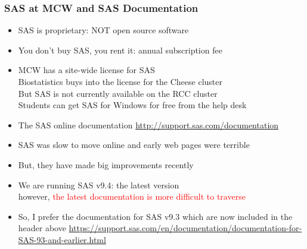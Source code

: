 \documentclass[11pt,pdftex,dvipsnames,usenames,helvetica]{beamer}
\begin{document}
\begin{frame}[fragile]
\frametitle{SAS at MCW and SAS Documentation}
\begin{itemize}
\item SAS is proprietary: NOT open source software
\item You don't buy SAS, you rent it: annual subscription fee
\item MCW has a site-wide license for SAS\\
Biostatistics buys into the license for the Cheese cluster\\
But SAS is not currently available on the RCC cluster\\
Students can get SAS for Windows for free from the help desk\\
\item The SAS online documentation
\url{http://support.sas.com/documentation}
\item SAS was slow to move online and early web pages were terrible
\item But, they have made big improvements recently
\item We are running SAS v9.4: the latest version\\
however, 
\textcolor{red}{the latest documentation is more difficult to traverse}
\item So, I prefer the documentation for SAS v9.3 which 
are now included in the header above
\textcolor{blue}{\url{https://support.sas.com/en/documentation/documentation-for-SAS-93-and-earlier.html}}
\end{itemize}
\end{frame}
\end{document}
